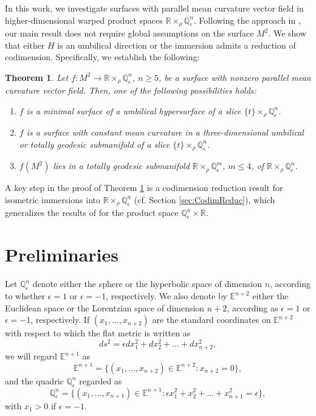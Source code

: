 \documentclass[11pt,a4paper]{article}
\newtheorem{teo}[defi]{Theorem}
\numberwithin{equation}{section}
\newcommand{\R}{\mathbb{R}}
\newcommand{\Q}{\mathbb{Q}}
\newcommand{\E}{\mathbb{E}}
\newcommand{\e}{\epsilon}
\newcommand{\WP}{\R\times_{\rho}\Q^n_{\epsilon}}
\newcommand{\co}{\colon}
\begin{document}
In this work, we investigate surfaces with parallel mean curvature vector field in higher-dimensional warped product spaces $\R\times_\rho\Q^n_\e$. Following the approach in \cite{AlCaTr}, our main result does not require global assumptions on the surface $M^2$. We show that either $H$ is an umbilical direction or the immersion admits a reduction of codimension. Specifically, we establish the following:

\begin{teo} \label{teo:main}
Let $f\co M^2\to\WP$, $n\geq 5$, be a surface with nonzero parallel mean curvature vector field. Then, one of the following possibilities holds:
\begin{enumerate}
\item[(i)] $f$ is a minimal surface of a umbilical hypersurface of a slice $\{t\}\times_{\rho}\Q^{n}_{\epsilon}$.
\item[(ii)] $f$ is a surface with constant mean curvature in a three-dimensional umbilical or totally geodesic submanifold of a slice $\{t\}\times_{\rho}\Q^{n}_{\epsilon}$.
\item[(iii)] $f(M^2)$ lies in a totally geodesic submanifold $\R\times_{\rho}\Q^{m}_{\epsilon}$, $m\leq 4$, of $\WP$.
\end{enumerate}
\end{teo}

A key step in the proof of Theorem \ref{teo:main} is a codimension reduction result for isometric immersions into $\R\times_\rho\Q^n_\e$ (cf. Section \ref{sec:CodimReduc}), which generalizes the results of \cite{MeTo} for the product space $\Q^n_\e\times\R$.






\section{Preliminaries}

Let $\Q^n_\e$ denote either the sphere or the hyperbolic space of dimension $n$, according to whether $\e=1$ or $\e=-1$, respectively.
We also denote by $\E^{n+2}$ either the Euclidean space or the Lorentzian space of dimension $n+2$, according as $\e=1$ or $\e=-1$, respectively. If $(x_1,\ldots,x_{n+2})$ are the standard coordinates on $\E^{n+2}$ with respect to which the flat metric is written as
\[
ds^2 = \e dx_1^2+dx_2^2+\ldots+dx_{n+2}^2,
\]
we will regard $\E^{n+1}$ as
\[
\E^{n+1} = \{(x_1,\ldots,x_{n+2})\in\E^{n+2}:x_{n+2}=0\},
\]
and the quadric $\Q^n_\e$ regarded as
\[
\Q^n_\e = \{(x_1,\ldots,x_{n+1})\in\E^{n+1}:\e x_1^2+x_2^2+\ldots
+x_{n+1}^2=\e\},
\]
with $x_1>0$ if $\e=-1$. 
\end{document}
